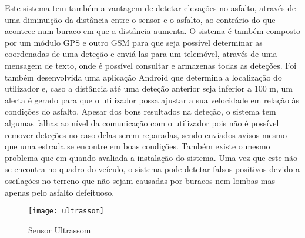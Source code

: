 Este sistema tem também a vantagem de detetar elevações no asfalto, através de uma diminuição da distância entre o sensor e o asfalto, ao contrário do que acontece num buraco em que a distância aumenta.
O sistema é também composto por um módulo GPS e outro GSM para que seja possível determinar as coordenadas de uma deteção e enviá-las para um telemóvel, através de uma mensagem de texto, onde é possível consultar e armazenas todas as deteções.
Foi também desenvolvida uma aplicação Android que determina a localização do utilizador e, caso a distância até uma deteção anterior seja inferior a 100 m, um alerta é gerado para que o utilizador possa ajustar a sua velocidade em relação às condições do asfalto.
Apesar dos bons resultados na deteção, o sistema tem algumas falhas ao nível da comunicação com o utilizador pois não é possível remover deteções no caso delas serem reparadas, sendo enviados avisos mesmo que uma estrada se encontre em boas condições.
Também existe o mesmo problema que em \cite{Hegde2015} quando avaliada a instalação do sistema. Uma vez que este não se encontra no quadro do veículo, o sistema pode detetar falsos positivos devido a oscilações no terreno que não sejam causadas por buracos nem lombas mas apenas pelo asfalto defeituoso.

\begin{figure}[hbtp]
	\centering
	\texttt{[image: ultrassom]}
	\caption[Sensor Ultrassom]{Sensor Ultrassom \footnotemark}
	\label{fig:sensor_ultrassom}
\end{figure}


